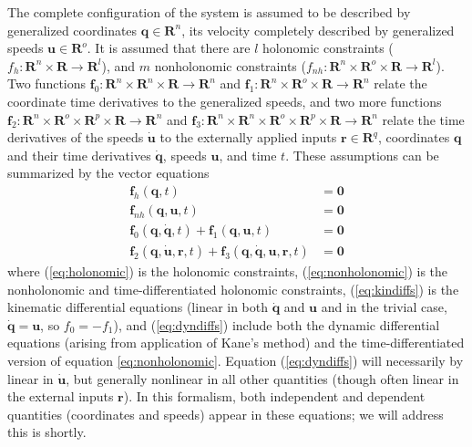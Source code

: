 \documentclass{svjour3}                     %
\begin{document}
The complete configuration of the system is assumed to be described by
generalized coordinates $\bm{q}\in\bm{R}^n$, its velocity completely described
by generalized speeds $\bm{u}\in\bm{R}^o$.  It is assumed that there are $l$
holonomic constraints ($f_h : \mathbf{R}^n \times \mathbf{R} \to
\mathbf{R}^l$), and $m$ nonholonomic constraints ($f_{nh} : \mathbf{R}^n \times
\mathbf{R}^o \times \mathbf{R} \to \mathbf{R}^l$). Two functions $\bm{f}_0 :
\mathbf{R}^n \times \mathbf{R}^n \times \mathbf{R} \to \mathbf{R}^n$ and
$\bm{f}_1 : \mathbf{R}^n \times \mathbf{R}^o \times \mathbf{R} \to
\mathbf{R}^n$ relate the coordinate time derivatives to the generalized speeds,
and two more functions $\bm{f}_2 : \mathbf{R}^n \times \mathbf{R}^o \times
\mathbf{R}^p \times \mathbf{R} \to \mathbf{R}^n$ and $\bm{f}_3 : \mathbf{R}^n
\times \mathbf{R}^n \times \mathbf{R}^o \times \mathbf{R}^p \times \mathbf{R}
\to \mathbf{R}^n$ relate the time derivatives of the speeds $\bm{\dot{u}}$ to
the externally applied inputs $\bm{r}\in\bm{R}^q$, coordinates $\bm{q}$ and
their time derivatives $\bm{\dot{q}}$,  speeds $\bm{u}$, and time $t$. These
assumptions can be summarized by the vector equations
\begin{align}
  \label{eq:holonomic}
  \bm{f}_{h}(\bm{q}, t) &= \bm{0}\\
  \label{eq:nonholonomic}
  \bm{f}_{nh}(\bm{q}, \bm{u}, t) &= \bm{0}\\
  \label{eq:kindiffs}
  \bm{f}_{0}(\bm{q}, \bm{\dot{q}}, t)
    + \bm{f}_{1}(\bm{q}, \bm{u}, t) &= \bm{0} \\
  \label{eq:dyndiffs}
  \bm{f}_{2}(\bm{q}, \bm{\dot{u}}, \bm{r}, t)
    + \bm{f}_{3}(\bm{q}, \bm{\dot{q}}, \bm{u}, \bm{r}, t) & = \bm{0}
\end{align}
where (\ref{eq:holonomic}) is the holonomic constraints,
(\ref{eq:nonholonomic}) is the nonholonomic and time-differentiated holonomic
constraints, (\ref{eq:kindiffs}) is the kinematic differential equations
(linear in both $\bm{\dot{q}}$ and $\bm{u}$ and in the trivial case,
$\bm{\dot{q}} = \bm{u}$, so $f_0 = -f_1$), and (\ref{eq:dyndiffs}) include both
the dynamic differential equations (arising from application of Kane's method)
and the time-differentiated version of equation \ref{eq:nonholonomic}.
Equation (\ref{eq:dyndiffs}) will necessarily by linear in $\bm{\dot{u}}$, but
generally nonlinear in all other quantities (though often linear in the
external inputs $\bm{r}$).  In this formalism, both independent and dependent
quantities (coordinates and speeds) appear in these equations; we will address
this is shortly.
\end{document}
